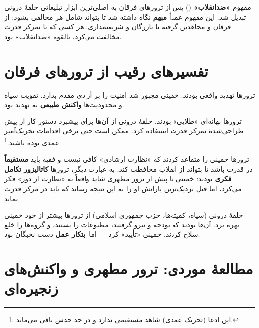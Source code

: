 \documentclass[12pt,a4paper]{book}
\newcommand{\keyword}[1]{\textbf{\textcolor{cPrimary}{#1}}}
\begin{document}
\begin{warningBox}
مفهوم \keyword{«ضدانقلاب»} () پس از ترورهای فرقان به اصلی‌ترین ابزار تبلیغاتی حلقهٔ درونی تبدیل شد. این مفهوم عمداً \keyword{مبهم} نگاه داشته شد تا بتواند شامل هر مخالفی بشود: از فرقان و مجاهدین گرفته تا بازرگان و شریعتمداری. هر کسی که با تمرکز قدرت مخالفت می‌کرد، بالقوه «ضدانقلاب» بود.
\end{warningBox}

\section{تفسیرهای رقیب از ترورهای فرقان}

\begin{principleBox}
\begin{description}[style=nextline, font=\bfseries\color{cPrimary}]
    \item[تز ۱ (صداقت + اجبار)]
    ترورها تهدید واقعی بودند. خمینی مجبور شد امنیت را بر آزادی مقدم بدارد. تقویت سپاه و محدودیت‌ها \keyword{واکنش طبیعی} به تهدید بود.

    \item[تز ۲ (خدعه)]
    ترورها بهانه‌ای «طلایی» بودند. حلقهٔ درونی از آن‌ها برای پیشبرد دستور کار از پیش طراحی‌شدهٔ تمرکز قدرت استفاده کرد. ممکن است حتی برخی اقدامات تحریک‌آمیز عمدی بوده باشند.\footnote{این ادعا (تحریک عمدی) شاهد مستقیمی ندارد و در حد حدس باقی می‌ماند.}

    \item[تز ۳ (تکامل)]
    ترورها خمینی را متقاعد کردند که «نظارت ارشادی» کافی نیست و فقیه باید \keyword{مستقیماً} در قدرت باشد تا بتواند از انقلاب محافظت کند. به عبارت دیگر، ترورها \keyword{کاتالیزور تکامل فکری} بودند: خمینی تا پیش از ترور مطهری شاید واقعاً به «نظارت از دور» فکر می‌کرد، اما قتل نزدیک‌ترین یارانش او را به این نتیجه رساند که باید در مرکز قدرت بماند.

    \item[تز ۴ (فشار نخبگان)]
    حلقهٔ درونی (سپاه، کمیته‌ها، حزب جمهوری اسلامی) از ترورها بیشتر از خود خمینی بهره برد. آن‌ها بودند که بودجه و نیرو گرفتند، مطبوعات را بستند، و گروه‌ها را خلع سلاح کردند. خمینی «تأیید» کرد — اما \keyword{ابتکار عمل} دست نخبگان بود.
\end{description}
\end{principleBox}

\section{مطالعهٔ موردی: ترور مطهری و واکنش‌های زنجیره‌ای}
\end{document}
